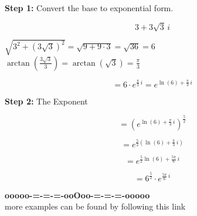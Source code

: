 \documentclass{ximera}
\begin{document}
\textbf{\textcolor{blue!55!black}{Step 1:}} Convert the base to exponential form.


\[
3 + 3\sqrt{3} \, i
\]


$\sqrt{3^2 + (3\sqrt{3})^2} = \sqrt{9 + 9 \cdot 3} = \sqrt{36} = 6$ \\

$\arctan\left( \frac{3\sqrt{3}}{3}  \right) = \arctan\left( \sqrt{3}  \right) = \frac{\pi}{3}$



\[
= 6 \cdot e^{\tfrac{\pi}{3} \, i} = e^{\ln(6) + \tfrac{\pi}{3} \, i}
\]



\textbf{\textcolor{blue!55!black}{Step 2:}} The Exponent



\[
= \left( e^{\ln(6) + \tfrac{\pi}{3} \, i} \right)^{\tfrac{5}{2}} 
\]


\[
= e^{\tfrac{5}{2} (\ln(6) + \tfrac{\pi}{3} \, i)}
\]



\[
= e^{\tfrac{5}{2} \ln(6) + \tfrac{5\pi}{6} \, i}
\]


\[
= 6^{\tfrac{5}{2}} \cdot e^{\tfrac{5\pi}{6} \, i}
\]









\begin{center}
\textbf{\textcolor{green!50!black}{ooooo-=-=-=-ooOoo-=-=-=-ooooo}} \\

more examples can be found by following this link\\ 

\end{center}
\end{document}
